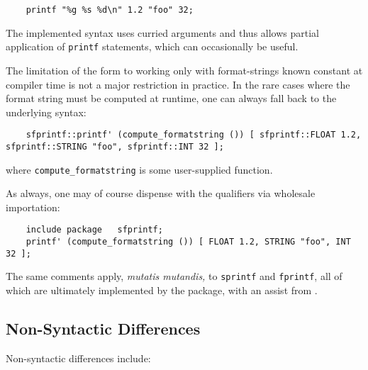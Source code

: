 \begin{verbatim}
    printf "%g %s %d\n" 1.2 "foo" 32;
\end{verbatim}

The implemented syntax uses curried arguments and thus allows partial 
application of {\tt printf} statements, which can occasionally be useful.

The limitation of the form to working only with format-strings 
known constant at compiler time is not a major restriction in practice. 
In the rare cases where the format string must be computed at runtime, 
one can always fall back to the underlying syntax: 

\begin{verbatim}
    sfprintf::printf' (compute_formatstring ()) [ sfprintf::FLOAT 1.2, sfprintf::STRING "foo", sfprintf::INT 32 ];
\end{verbatim}

where {\tt compute\_formatstring} is some user-supplied function. 

As always, one may of course dispense with the qualifiers via wholesale importation: 
\begin{verbatim}
    include package   sfprintf;
    printf' (compute_formatstring ()) [ FLOAT 1.2, STRING "foo", INT 32 ];
\end{verbatim}


The same comments apply, {\it mutatis mutandis,}  to {\tt sprintf} and {\tt fprintf}, all of which are ultimately implemented by the 
 package, with an assist from 
.

\cutend*

\subsection{Non-Syntactic Differences}
Non-syntactic differences include:

